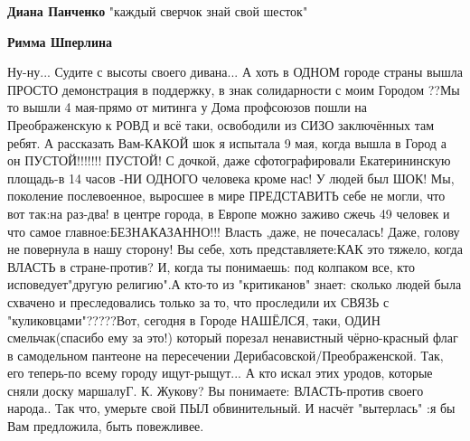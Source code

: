 \begin{itemize}
\begin{itemize}
 
\textbf{Диана Панченко} "каждый сверчок знай свой шесток"

 

\textbf{Римма Шперлина} 

Ну-ну... Судите с высоты своего дивана... А хоть в ОДНОМ
городе страны вышла ПРОСТО демонстрация в поддержку, в знак солидарности с моим
Городом ??Мы то вышли 4 мая-прямо от митинга у Дома профсоюзов пошли на
Преображенскую к РОВД и всё таки, освободили из СИЗО заключённых там ребят. А
рассказать Вам-КАКОЙ шок я испытала 9 мая, когда вышла в Город а он
ПУСТОЙ!!!!!!! ПУСТОЙ! С дочкой, даже сфотографировали Екатерининскую площадь-в 14
часов -НИ ОДНОГО человека кроме нас! У людей был ШОК! Мы, поколение
послевоенное, выросшее в мире ПРЕДСТАВИТЬ себе не могли, что вот так:на раз-два!
в центре города, в Европе можно заживо сжечь 49 человек и что самое
главное:БЕЗНАКАЗАННО!!! Власть ,даже, не почесалась! Даже, голову не повернула в
нашу сторону! Вы себе, хоть представляете:КАК это тяжело, когда ВЛАСТЬ в
стране-против? И, когда ты понимаешь: под колпаком все, кто исповедует"другую
религию".А кто-то из "критиканов" знает: сколько людей была схвачено и
преследовались только за то, что проследили их СВЯЗЬ с
"куликовцами"?????Вот, сегодня в Городе НАШЁЛСЯ, таки, ОДИН смельчак(спасибо ему
за это!) который порезал ненавистный чёрно-красный флаг в самодельном пантеоне
на пересечении Дерибасовской/Преображенской. Так, его теперь-по всему городу
ищут-рыщут... А кто искал этих уродов, которые сняли доску маршалуГ. К. Жукову? Вы
понимаете: ВЛАСТЬ-против своего народа.. Так что, умерьте свой ПЫЛ
обвинительный. И насчёт "вытерлась" :я бы Вам предложила, быть повежливее.


\end{itemize}

\end{itemize}

